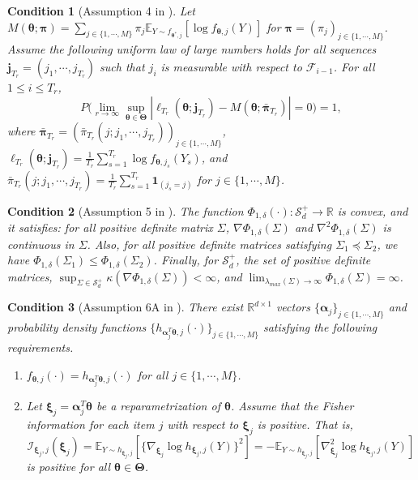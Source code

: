 \documentclass[12pt]{article}
\newcommand{\bfTheta}{\boldsymbol{\Theta}}
\newcommand{\bfalpha}{\boldsymbol{\alpha}}
\newcommand{\bfpi}{\boldsymbol{\pi}}
\newcommand{\bftheta}{\boldsymbol{\theta}}
\newcommand{\bfxi}{\boldsymbol{\xi}}
\newtheorem{condition}{Condition}[section]
\begin{document}
\begin{condition}[Assumption 4 in ] \label{c:c4}
Let $M(\bftheta; \bfpi) = \sum_{j \in \{1,\cdots,M\}} \pi_j \mathbb{E}_{Y \sim f_{\bftheta^{\ast}, j}} [\log f_{\bftheta,j}(Y)]$ for $\bfpi = (\pi_j)_{j \in \{1,\cdots,M\}}$. Assume the following uniform law of large numbers holds for all sequences $\mathbf{j}_{T_r} = (j_1,\cdots,j_{T_r})$ such that $j_i$ is measurable with respect to $\mathcal{F}_{i-1}$. For all $1 \leq i \leq T_r$,
\begin{equation*}
P \Big( \lim_{r \to \infty} \sup_{\bftheta \in \bfTheta} | \ell_{T_r}(\bftheta ; \mathbf{j}_{T_r}) - M(\bftheta ; \bar{\bfpi}_{T_r})| = 0  \Big) = 1,
\end{equation*}
where $\bar{\bfpi}_{T_r} = (\bar{\pi}_{T_r}(j ; j_1, \cdots, j_{T_r}))_{j \in \{1,\cdots,M\}}$, $\ell_{T_r}(\bftheta;\mathbf{j}_{T_r}) = \frac{1}{T_r} \sum_{s=1}^{T_r} \log f_{\bftheta,j_s}(Y_s)$, and $\bar{\pi}_{T_r}(j; j_1, \cdots, j_{T_r}) = \frac{1}{T_r} \sum_{s=1}^{T_r} \mathbf{1}_{(j_s = j)}$ for $j \in \{1,\cdots,M\}$.
\end{condition}

\begin{condition}[Assumption 5 in ] \label{c:c5}
The function $\Phi_{1,\delta}(\cdot):\mathcal{S}_d^{+} \to \mathbb{R}$ is convex, and it satisfies: for all positive definite matrix $\Sigma$, $\nabla \Phi_{1,\delta}(\Sigma)$ and $\nabla^2 \Phi_{1,\delta}(\Sigma)$ is continuous in $\Sigma$. Also, for all positive definite matrices satisfying $\Sigma_1 \preceq \Sigma_2$, we have $\Phi_{1,\delta}(\Sigma_1) \le \Phi_{1,\delta}(\Sigma_2)$. Finally, for $\mathcal{S}_d^+$, the set of positive definite matrices, $\sup_{\Sigma \in \mathcal{S}_d^+} \kappa( \nabla \Phi_{1,\delta}(\Sigma)) < \infty$, and $\lim_{\lambda_{max}(\Sigma) \to \infty} \Phi_{1,\delta}(\Sigma) = \infty$.
\end{condition}

\begin{condition}[Assumption 6A in ] \label{c:c6a}
There exist $\mathbb{R}^{d \times 1}$ vectors $\{\bfalpha_j\}_{j \in \{1,\cdots,M\}}$ and probability density functions $\{h_{\bfalpha_j^T \bftheta, j}(\cdot)\}_{j \in \{1,\cdots,M\}}$ satisfying the following requirements.
\begin{enumerate}
\item{$f_{\bftheta, j}(\cdot) = h_{\bfalpha_j^T \bftheta, j}(\cdot)$ for all $j \in \{1, \cdots, M\}$.}
\item{Let $\bfxi_j = \bfalpha_j^T \bftheta$ be a reparametrization of $\bftheta$. Assume that the Fisher information for each item $j$ with respect to $\bfxi_j$ is positive. That is, 
\begin{equation*}
\mathcal{I}_{\bfxi_j, j}(\bfxi_j) 
= \mathbb{E}_{Y \sim h_{\bfxi_j, j}}[ \{ \nabla_{\bfxi_j} \log h_{\bfxi_j, j}(Y) \}^2]
= -\mathbb{E}_{Y \sim h_{\bfxi_j, j}} [\nabla_{\bfxi_j}^2 \log h_{\bfxi_j, j}(Y)]
\end{equation*}
is positive for all $\bftheta \in \bfTheta$.}
\end{enumerate}
\end{condition}
\end{document}
